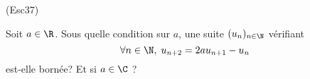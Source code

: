 \begin{tiny}(Esc37)\end{tiny} Soit $a\in \R$. Sous quelle condition sur $a$, une suite $(u_n)_{n\in \N}$ vérifiant
\[
  \forall n \in \N, \; u_{n+2} = 2a u_{n+1} - u_n
\]
est-elle bornée? Et si $a\in \C$ ? 
